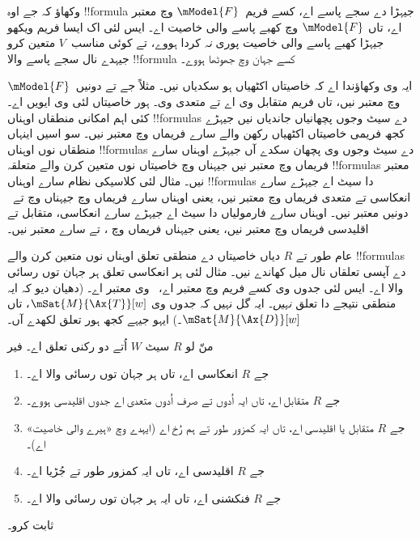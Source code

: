 \documentclass[../../../include/open-logic-section]{subfiles}
\begin{document}
\begin{prob}
وکھاؤ کہ جے اوہ !!{formula} جیہڑا
 دے سجے پاسے اے، کسے فریم~$\mModel{F}$ وچ معتبر اے، تاں
$\mModel{F}$ وچ کھبے پاسے والی خاصیت اے۔ ایس لئی اک ایسا فریم ویکھو جیہڑا کھبے پاسے والی خاصیت پوری \emph{نہ} کردا ہووے، تے کوئی مناسب~$V$ متعین کرو جیہدے نال سجے پاسے والا !!{formula} کسے جہان وچ جھوٹھا ہووے۔
\end{prob}

 ایہ وی وکھاؤندا اے کہ خاصیتاں اکٹھیاں ہو سکدیاں نیں۔ مثلاً جے  تے  دونیں~$\mModel{F}$ وچ معتبر نیں، تاں فریم متقابل وی اے تے متعدی وی۔ ہور خاصیتاں لئی وی ایویں اے۔ کئی اہم امکانی منطقاں اوہناں !!{formula}s دے سیٹ وجوں پچھانیاں جاندیاں نیں جیہڑے کجھ فریمی خاصیتاں اکٹھیاں رکھن والے سارے فریماں وچ معتبر نیں۔ سو اسیں اینہاں منطقاں نوں اوہناں !!{formula}s دے سیٹ وجوں وی پچھان سکدے آں جیہڑے اوہناں سارے فریماں وچ معتبر نیں جیہناں وچ خاصیتاں نوں متعین کرن والے متعلقہ !!{formula}s معتبر نیں۔ مثال لئی کلاسیکی نظام  سارے اوہناں !!{formula}s دا سیٹ اے جیہڑے سارے انعکاسی تے متعدی فریماں وچ معتبر نیں، یعنی اوہناں سارے فریماں وچ جیہناں وچ  تے~ دونیں معتبر نیں۔  اوہناں سارے فارمولیاں دا سیٹ اے جیہڑے سارے انعکاسی، متقابل تے اقلیدسی فریماں وچ معتبر نیں، یعنی جیہناں فریماں وچ ،  تے  سارے معتبر نیں۔

عام طور تے $R$ دیاں خاصیتاں دے منطقی تعلق اوہناں نوں متعین کرن والے !!{formula}s دے آپسی تعلقاں نال میل کھاندے نیں۔ مثال لئی ہر انعکاسی تعلق ہر جہان توں رسائی والا اے۔ ایس لئی جدوں وی  کسے فریم وچ معتبر اے،~ وی معتبر اے۔ (دھیان دیو کہ ایہ منطقی نتیجے دا تعلق \emph{نہیں}۔ ایہ گل نہیں کہ جدوں وی
$\mSat{M}{\Ax{T}}[w]$، تاں $\mSat{M}{\Ax{D}}[w]$۔) ایہو جیہے کجھ ہور تعلق لکھدے آں۔

\begin{prop}
  منّ لو $R$ سیٹ $W$ اُتے دو رکنی تعلق اے۔ فیر
  \begin{enumerate}
  \item جے $R$ انعکاسی اے، تاں ہر جہان توں رسائی والا اے۔
  \item جے $R$ متقابل اے، تاں ایہ اُدوں تے صرف اُدوں متعدی اے جدوں اقلیدسی ہووے۔
  \item جے $R$ متقابل یا اقلیدسی اے، تاں ایہ کمزور طور تے ہم رُخ اے (ایہدے وچ «ہیرے والی خاصیت» اے)۔
  \item جے $R$ اقلیدسی اے، تاں ایہ کمزور طور تے جُڑیا اے۔
  \item جے $R$ فنکشنی اے، تاں ایہ ہر جہان توں رسائی والا اے۔
  \end{enumerate}
\end{prop}

\begin{prob}
   ثابت کرو۔
\end{prob}
\end{document}
